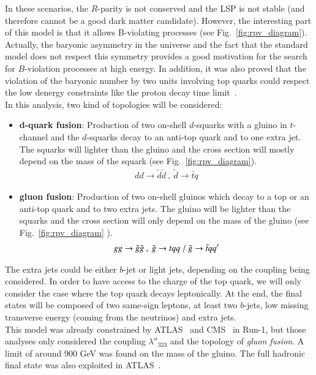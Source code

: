  In these scenarios, the $R$-parity is not conserved and the LSP is not stable (and therefore cannot be a good dark matter candidate).
 However, the interesting part of this model is that it allows B-violating processes (see Fig.~\ref{fig:rpv_diagram}).
 Actually, the baryonic asymmetry in the universe and the fact that the standard model does not respect this symmetry provides a good motivation for the search for $B$-violation processes at high energy.
 In addition, it was also proved that the violation of the baryonic number by two units involving top quarks could respect the low denergy constraints like the proton decay time limit~\cite{Durieux:2012gj}.
\\

In this analysis, two kind of topologies will be considered:
\begin{itemize}
\item \textbf{d-quark fusion}: Production of two on-shell $d$-squarks with a gluino in $t$-channel and the $d$-squarks decay to an anti-top quark and to one extra jet.
  The squarks will lighter than the gluino and the cross section will mostly depend on the mass of the squark (see Fig.~\ref{fig:rpv_diagram}).
  \begin{align}
    dd \to \tilde{d} \tilde{d}\ ,\ \tilde{d} \to \bar{t}q    
  \end{align}
\item \textbf{gluon fusion}: Production of two on-shell gluinos which decay to a top or an anti-top quark and to two extra jets.
  The gluino will be lighter than the squarks and the cross section will only depend on the mass of the gluino (see Fig.~\ref{fig:rpv_diagram} ).
  \begin{align}
    gg \rightarrow \tilde{g} \tilde{g} \ ,\ \tilde{g}  \rightarrow tqq\ /\ \tilde{g}  \rightarrow \bar{t}qq'
  \end{align}
\end{itemize}
The extra jets could be either $b$-jet or light jets, depending on the coupling being considered. 
In order to have access to the charge of the top quark, we will only consider the case where the top quark decays leptonically.
At the end, the final states will be composed of two same-sign leptons, at least two $b$-jets, low missing transverse energy (coming from the neutrinos) and extra jets.
\\

 This model was already constrained by ATLAS~\cite{Aad:2014pda} and CMS~\cite{Chatrchyan:2013fea} in Run-1, but those analyses 
 only considered the coupling $\lambda''_{323}$ and the topology of \textit{gluon fusion}.
 A limit of around 900 GeV was found on the mass of the gluino. The full hadronic final state was also exploited in ATLAS~\cite{Aad:2013wta}.

